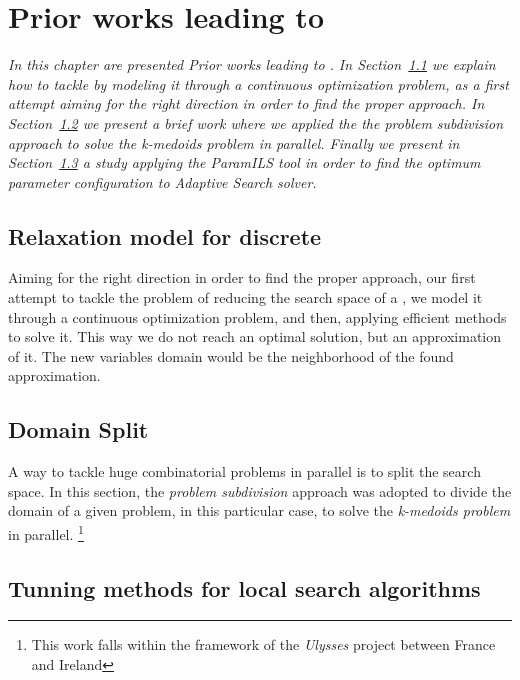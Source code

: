 \chapter{Prior works leading to \af}
\label{chap:prior}
\textit{In this chapter are presented Prior works leading to \af. In Section~\ref{sec:relaxation} we explain how to tackle \csps{} by modeling it through a continuous optimization problem, as a first attempt aiming for the right direction in order to find the proper approach. In Section~\ref{sec:split} we present a brief work where we applied the the {\it problem subdivision} approach to solve the {\it k-medoids problem} in parallel. Finally we present in Section~\ref{sec:paramils} a study applying the {\sc ParamILS} tool in order to find the optimum parameter configuration to {\it Adaptive Search} solver.}
\vspace{2ex}\vfill
\minitoc
\newpage

\section{Relaxation model for discrete \csps}
\label{sec:relaxation}

Aiming for the right direction in order to find the proper approach, our first attempt to tackle the problem of reducing the search space of a \csp, we model it through a continuous optimization problem, and then, applying efficient methods to solve it. This way we do not reach an optimal solution, but an approximation of it. The new variables domain would be the neighborhood of the found approximation.



\section{Domain Split}
\label{sec:split}

A way to tackle huge combinatorial problems in parallel is to split the search space. In this section, the {\it problem subdivision} approach was adopted to divide the domain of a given problem, in this particular case, to solve the {\it k-medoids problem} in parallel. \footnote{This work falls within the framework of the \textit{Ulysses} project between France and Ireland}



\section{Tunning methods for local search algorithms}
\label{sec:paramils}

